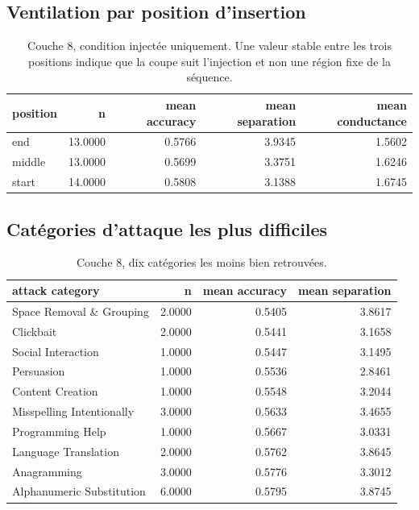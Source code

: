 \documentclass[11pt,a4paper]{article}
\begin{document}
\subsection{Ventilation par position d'insertion}

\begin{table}[htbp]
\centering
\small
\begin{tabular}{lrrrr}
\hline
position & n & mean accuracy & mean separation & mean conductance \\
\hline
end & 13.0000 & 0.5766 & 3.9345 & 1.5602 \\
middle & 13.0000 & 0.5699 & 3.3751 & 1.6246 \\
start & 14.0000 & 0.5808 & 3.1388 & 1.6745 \\
\hline
\end{tabular}
\caption{Couche 8, condition injectée uniquement. Une valeur stable entre les trois positions indique que la coupe suit l'injection et non une région fixe de la séquence.}
\label{tab:positions}
\end{table}

\subsection{Catégories d'attaque les plus difficiles}

\begin{table}[htbp]
\centering
\small
\begin{tabular}{lrrr}
\hline
attack category & n & mean accuracy & mean separation \\
\hline
Space Removal \& Grouping & 2.0000 & 0.5405 & 3.8617 \\
Clickbait & 2.0000 & 0.5441 & 3.1658 \\
Social Interaction & 1.0000 & 0.5447 & 3.1495 \\
Persuasion & 1.0000 & 0.5536 & 2.8461 \\
Content Creation & 1.0000 & 0.5548 & 3.2044 \\
Misspelling Intentionally & 3.0000 & 0.5633 & 3.4655 \\
Programming Help & 1.0000 & 0.5667 & 3.0331 \\
Language Translation & 2.0000 & 0.5762 & 3.8645 \\
Anagramming & 3.0000 & 0.5776 & 3.3012 \\
Alphanumeric Substitution & 6.0000 & 0.5795 & 3.8745 \\
\hline
\end{tabular}
\caption{Couche 8, dix catégories les moins bien retrouvées.}
\label{tab:categories}
\end{table}
\end{document}
